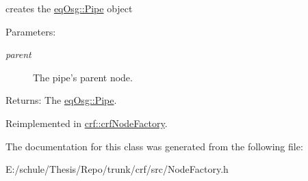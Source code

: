creates the \hyperlink{a00014}{eqOsg::Pipe} object 

\begin{Desc}
\item[Parameters:]
\begin{description}
\item[{\em parent}]The pipe's parent node. \end{description}
\end{Desc}
\begin{Desc}
\item[Returns:]The \hyperlink{a00014}{eqOsg::Pipe}. \end{Desc}


Reimplemented in \hyperlink{a00005_5f35c307f323b385869226c6083df93d}{crf::crfNodeFactory}.

The documentation for this class was generated from the following file:\begin{CompactItemize}
\item 
E:/schule/Thesis/Repo/trunk/crf/src/NodeFactory.h\end{CompactItemize}

